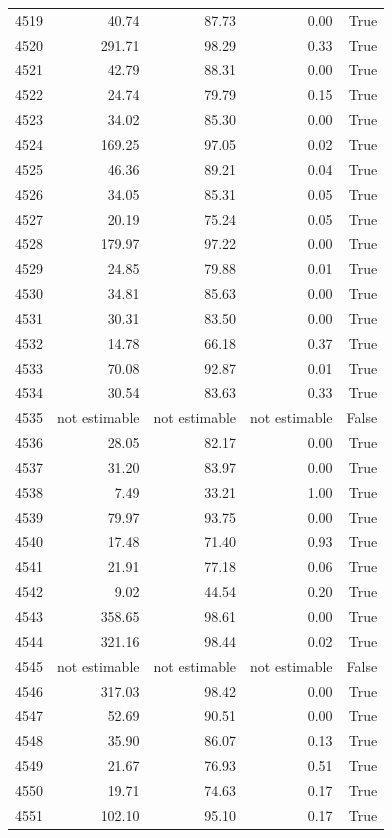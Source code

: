 \begin{longtable}{rrrrr}
4519 & 40.74 & 87.73 & 0.00 & True \\
4520 & 291.71 & 98.29 & 0.33 & True \\
4521 & 42.79 & 88.31 & 0.00 & True \\
4522 & 24.74 & 79.79 & 0.15 & True \\
4523 & 34.02 & 85.30 & 0.00 & True \\
4524 & 169.25 & 97.05 & 0.02 & True \\
4525 & 46.36 & 89.21 & 0.04 & True \\
4526 & 34.05 & 85.31 & 0.05 & True \\
4527 & 20.19 & 75.24 & 0.05 & True \\
4528 & 179.97 & 97.22 & 0.00 & True \\
4529 & 24.85 & 79.88 & 0.01 & True \\
4530 & 34.81 & 85.63 & 0.00 & True \\
4531 & 30.31 & 83.50 & 0.00 & True \\
4532 & 14.78 & 66.18 & 0.37 & True \\
4533 & 70.08 & 92.87 & 0.01 & True \\
4534 & 30.54 & 83.63 & 0.33 & True \\
4535 & not estimable & not estimable & not estimable & False \\
4536 & 28.05 & 82.17 & 0.00 & True \\
4537 & 31.20 & 83.97 & 0.00 & True \\
4538 & 7.49 & 33.21 & 1.00 & True \\
4539 & 79.97 & 93.75 & 0.00 & True \\
4540 & 17.48 & 71.40 & 0.93 & True \\
4541 & 21.91 & 77.18 & 0.06 & True \\
4542 & 9.02 & 44.54 & 0.20 & True \\
4543 & 358.65 & 98.61 & 0.00 & True \\
4544 & 321.16 & 98.44 & 0.02 & True \\
4545 & not estimable & not estimable & not estimable & False \\
4546 & 317.03 & 98.42 & 0.00 & True \\
4547 & 52.69 & 90.51 & 0.00 & True \\
4548 & 35.90 & 86.07 & 0.13 & True \\
4549 & 21.67 & 76.93 & 0.51 & True \\
4550 & 19.71 & 74.63 & 0.17 & True \\
4551 & 102.10 & 95.10 & 0.17 & True \\

\end{longtable}
